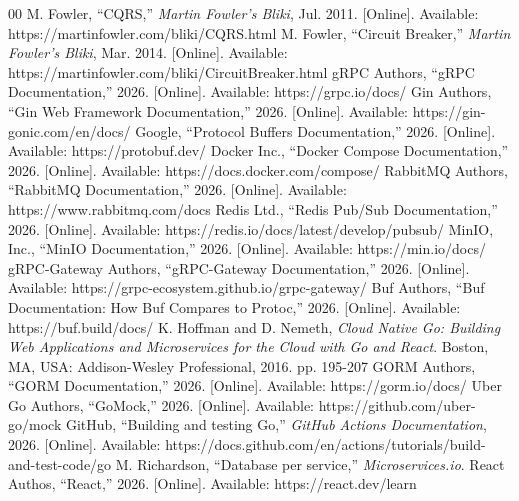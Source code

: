 \documentclass[conference]{IEEEtran}
\begin{document}
\begin{thebibliography}{00}
M. Fowler, ``CQRS,'' \textit{Martin Fowler's Bliki}, Jul. 2011.
[Online]. Available: https://martinfowler.com/bliki/CQRS.html
M. Fowler, ``Circuit Breaker,'' \textit{Martin Fowler's Bliki}, Mar. 2014.
[Online]. Available: https://martinfowler.com/bliki/CircuitBreaker.html
gRPC Authors, ``gRPC Documentation,'' 2026.
[Online]. Available: https://grpc.io/docs/
Gin Authors, ``Gin Web Framework Documentation,'' 2026.
[Online]. Available: https://gin-gonic.com/en/docs/
Google, ``Protocol Buffers Documentation,'' 2026.
[Online]. Available: https://protobuf.dev/
Docker Inc., ``Docker Compose Documentation,'' 2026.
[Online]. Available: https://docs.docker.com/compose/
RabbitMQ Authors, ``RabbitMQ Documentation,'' 2026.
[Online]. Available: https://www.rabbitmq.com/docs
Redis Ltd., ``Redis Pub/Sub Documentation,'' 2026.
[Online]. Available: https://redis.io/docs/latest/develop/pubsub/
MinIO, Inc., ``MinIO Documentation,'' 2026.
[Online]. Available: https://min.io/docs/
gRPC-Gateway Authors, ``gRPC-Gateway Documentation,'' 2026.
[Online]. Available: https://grpc-ecosystem.github.io/grpc-gateway/
Buf Authors, ``Buf Documentation: How Buf Compares to Protoc,'' 2026.
[Online]. Available: https://buf.build/docs/
K. Hoffman and D. Nemeth, \textit{Cloud Native Go: Building Web Applications and Microservices for the Cloud with Go and React}.
Boston, MA, USA: Addison-Wesley Professional, 2016. pp. 195-207
GORM Authors, ``GORM Documentation,'' 2026.
[Online]. Available: https://gorm.io/docs/
Uber Go Authors, ``GoMock,'' 2026.
[Online]. Available: https://github.com/uber-go/mock
GitHub, ``Building and testing Go,'' \textit{GitHub Actions Documentation}, 2026.
[Online]. Available: https://docs.github.com/en/actions/tutorials/build-and-test-code/go
M. Richardson, ``Database per service,'' \textit{Microservices.io}.
React Authos, ``React,'' 2026. 
[Online]. Available: https://react.dev/learn
\end{thebibliography}
\end{document}
